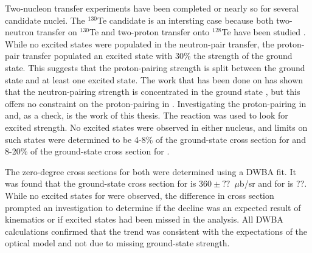 Two-nucleon transfer experiments have been completed or nearly so for several candidate nuclei.  The $^{130}$Te candidate is an intersting case because both two-neutron transfer on $^{130}$Te and two-proton transfer onto $^{128}$Te have been studied \cite{neutronPairsTellurium,protonPairsTellurium}.  While no excited \zp states were populated in the neutron-pair transfer, the proton-pair transfer populated an excited \zp state with 30\% the strength of the ground state.  This suggests that the proton-pairing strength is split between the ground state and at least one excited \zp state.   The work that has been done on  has shown that the neutron-pairing strength is concentrated in the ground state \cite{neutronPairsGermanium}, but this offers no constraint on the proton-pairing in .  Investigating the proton-pairing in  and, as a check,  is the work of this thesis.  The reaction \reaction was used to look for excited \zp strength.  No excited \zp states were observed in either nucleus, and limits on such states were determined to be 4-8\% of the ground-state cross section for  and 8-20\% of the ground-state cross section for .  

The zero-degree cross sections for both \GeTargets were determined using a DWBA fit.  It was found that the ground-state cross section for  is $360\pm??$~$\mu$b/sr and for  is ??.  While no excited states for  were observed, the difference in cross section prompted an investigation to determine if the decline was an expected result of kinematics or if excited \zp states had been missed in the analysis.  All DWBA calculations confirmed that the trend was consistent with the expectations of the optical model and not due to missing ground-state \zp strength. 


